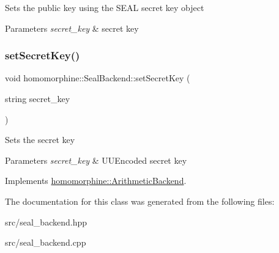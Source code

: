 Sets the public key using the S\+E\+AL secret key object


\begin{DoxyParams}{Parameters}
{\em secret\+\_\+key} & secret key \\
\hline
\end{DoxyParams}
\mbox{\label{classhomomorphine_1_1_seal_backend_aa9fd3331b2c710e8fdfc3385bbf11eb5}} 
\subsubsection{\texorpdfstring{setSecretKey()}{setSecretKey()}}
{\footnotesize\ttfamily void homomorphine\+::\+Seal\+Backend\+::set\+Secret\+Key (\begin{DoxyParamCaption}\item[{string}]{secret\+\_\+key }\end{DoxyParamCaption})\hspace{0.3cm}{\ttfamily [virtual]}}

Sets the secret key


\begin{DoxyParams}{Parameters}
{\em secret\+\_\+key} & U\+U\+Encoded secret key \\
\hline
\end{DoxyParams}


Implements \mbox{\hyperlink{classhomomorphine_1_1_arithmetic_backend_a0bb3c2728df4662c6472d4d43215410f}{homomorphine\+::\+Arithmetic\+Backend}}.



The documentation for this class was generated from the following files\+:\begin{DoxyCompactItemize}
\item 
src/seal\+\_\+backend.\+hpp\item 
src/seal\+\_\+backend.\+cpp\end{DoxyCompactItemize}
